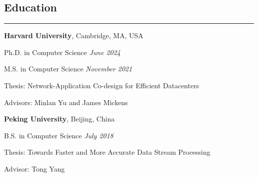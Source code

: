 \documentclass[letterpaper, 11pt]{article}
\newcommand\toRight{\hspace*{0pt}\hfill}
\newenvironment{compactlist}%
  {\begin{list}{}{}%
    \vspace{-0.06in}
    \setlength{\itemsep}{0pt}%
    \setlength{\parskip}{0pt}}%
  {\end{list}}
\begin{document}
\subsection*{\sc Education}
\hrule\vspace{0.2cm}

\begin{list}{}{\setlength{\leftmargin}{0in}}
    \setlength{\itemsep}{0pt}%
    \setlength{\parskip}{2pt}%

\item {\bf Harvard University}, Cambridge, MA, USA
\begin{compactlist}
    \item Ph.D. in Computer Science \toRight \textit{June 2024}
    \item M.S. in Computer Science \toRight \textit{November 2021}
    \item Thesis: Network-Application Co-design for Efficient Datacenters
    \item Advisors: Minlan Yu and James Mickens
\end{compactlist}

\item {\bf Peking University}, Beijing, China 
\begin{compactlist}
    \item B.S. in Computer Science \toRight \textit{July 2018}
    \item Thesis: Towards Faster and More Accurate Data Stream Processing
    \item Advisor: Tong Yang
\end{compactlist}

\end{list}

\end{document}
